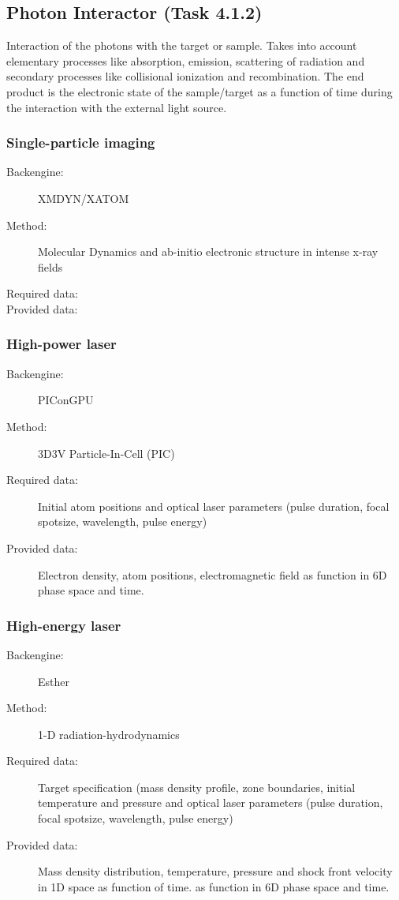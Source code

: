 \documentclass[12pt]{scrartcl}
\begin{document}
\subsection{Photon Interactor (Task 4.1.2)}
Interaction of the photons with the target or sample. Takes into account
elementary processes like absorption, emission, scattering of radiation and
secondary processes like collisional ionization and recombination. The end
product is the electronic state of the sample/target as a function of time
during the interaction with the external light source.
\subsubsection{Single-particle imaging}
\begin{description}
  \item[Backengine:] XMDYN/XATOM
  \item[Method:] Molecular Dynamics and ab-initio
    electronic structure in intense x-ray fields \cite{Jurek2016, Son2013,
    Ziaja2015}
  \item[Required data:]
  \item[Provided data:]
\end{description}

\subsubsection{High-power laser\label{sec:hpl}}
\begin{description}
  \item[Backengine:] PIConGPU \cite{Bussmann2013}
  \item[Method:] 3D3V Particle-In-Cell (PIC)
  \item[Required data:] Initial atom positions and optical laser parameters
    (pulse duration, focal spotsize, wavelength, pulse energy)
  \item[Provided data:] Electron density, atom positions, electromagnetic field
    as function in 6D phase space and time.
\end{description}
%
\subsubsection{High-energy laser}
\begin{description}
  \item[Backengine:] Esther
  \item[Method:] 1-D radiation-hydrodynamics
  \item[Required data:] Target specification (mass density profile, zone
    boundaries, initial temperature and pressure and optical laser parameters
    (pulse duration, focal spotsize, wavelength, pulse energy)
  \item[Provided data:] Mass density distribution, temperature, pressure and
    shock front velocity in 1D space as function of time.
    as function in 6D phase space and time.
\end{description}
\end{document}
